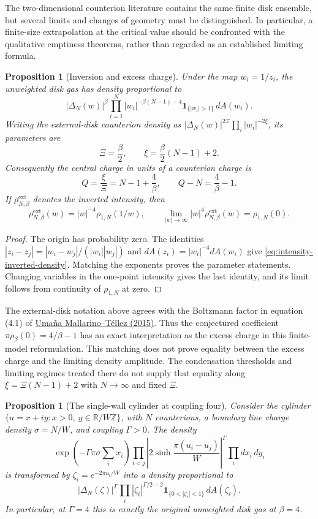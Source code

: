 \documentclass[11pt,a4paper]{article}
\numberwithin{equation}{section}
\newtheorem{proposition}[theorem]{Proposition}
\theoremstyle{definition}
\theoremstyle{remark}
\begin{document}
The two-dimensional counterion literature contains the same finite
disk ensemble, but several limits and changes of geometry must be
distinguished.  In particular, a finite-size extrapolation at the
critical value should be confronted with the qualitative emptiness
theorems, rather than regarded as an established limiting formula.

\begin{proposition}[Inversion and excess charge]
\label{prop:intensity-inversion-excess-charge}
Under the map $w_i=1/z_i$, the unweighted disk gas has density proportional to
\begin{equation}\label{eq:intensity-inverted-density}
 |\Delta_N(w)|^\beta
 \prod_{i=1}^N |w_i|^{-\beta(N-1)-4}
 \mathbf 1_{\{|w_i|>1\}}\,dA(w_i).
\end{equation}
Writing the external-disk counterion density as
$|\Delta_N(w)|^{2\Xi}\prod_i|w_i|^{-2\xi}$, its parameters are
\[
 \Xi=\frac\beta2,\qquad
 \xi=\frac\beta2(N-1)+2.
\]
Consequently the central charge in units of a counterion charge is
\[
 Q=\frac\xi\Xi=N-1+\frac4\beta,
 \qquad Q-N=\frac4\beta-1.
\]
If $\rho^{\mathrm{ext}}_{N,\beta}$ denotes the inverted intensity, then
\[
 \rho^{\mathrm{ext}}_{N,\beta}(w)
   =|w|^{-4}\rho_{1,N}(1/w),\qquad
 \lim_{|w|\to\infty}|w|^4\rho^{\mathrm{ext}}_{N,\beta}(w)
   =\rho_{1,N}(0).
\]
\end{proposition}

\begin{proof}
The origin has probability zero.  The identities
$|z_i-z_j|=|w_i-w_j|/(|w_i||w_j|)$ and
$dA(z_i)=|w_i|^{-4}dA(w_i)$ give
\eqref{eq:intensity-inverted-density}.  Matching the exponents proves
the parameter statements.  Changing variables in the one-point
intensity gives the last identity, and its limit follows from
continuity of $\rho_{1,N}$ at zero.
\end{proof}

The external-disk notation above agrees with the Boltzmann factor
in equation (4.1) of
\href{https://arxiv.org/pdf/1502.05291}{Uma\~na Mallarino--T\'ellez (2015)}.
Thus the conjectured coefficient $\pi\rho_\beta(0)=4/\beta-1$
has an exact interpretation as the excess charge in this finite-model
reformulation.  This matching does not prove equality between the excess
charge and the limiting density amplitude.  The condensation thresholds
and limiting regimes treated there do not supply that equality along
$\xi=\Xi(N-1)+2$ with $N\to\infty$ and fixed $\Xi$.

\begin{proposition}[The single-wall cylinder at coupling four]
\label{prop:intensity-cylinder-critical-identification}
Consider the cylinder $\{u=x+iy:x>0,\ y\in\mathbb R/W\mathbb Z\}$,
with $N$ counterions, a boundary line charge density $\sigma=N/W$,
and coupling $\Gamma>0$.  The density
\[
 \exp\left(-\Gamma\pi\sigma\sum_i x_i\right)
 \prod_{i<j}\left|2\sinh\frac{\pi(u_i-u_j)}W\right|^\Gamma
 \prod_i dx_i\,dy_i
\]
is transformed by $\zeta_i=e^{-2\pi u_i/W}$ into a density proportional to
\[
 |\Delta_N(\zeta)|^\Gamma
 \prod_i|\zeta_i|^{\Gamma/2-2}
 \mathbf 1_{\{0<|\zeta_i|<1\}}\,dA(\zeta_i).
\]
In particular, at $\Gamma=4$ this is exactly the original unweighted
disk gas at $\beta=4$.
\end{proposition}
\end{document}

